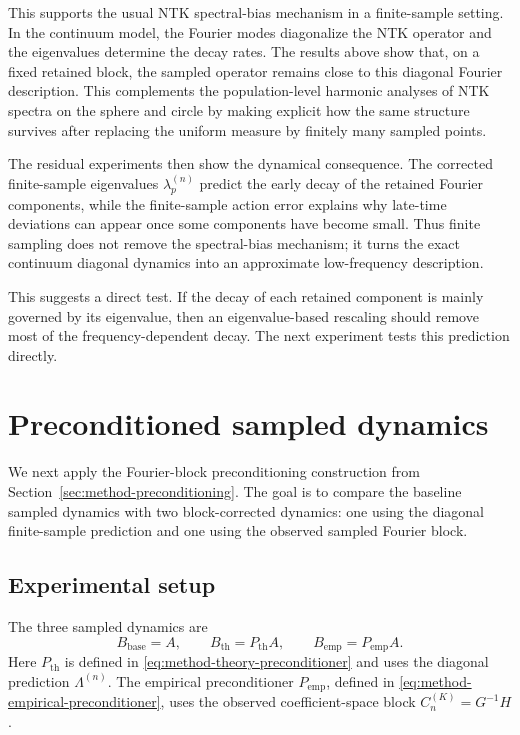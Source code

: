 This supports the usual NTK spectral-bias mechanism in a finite-sample setting.
In the continuum model, the Fourier modes diagonalize the NTK operator and the
eigenvalues determine the decay rates. The results above show that, on a fixed
retained block, the sampled operator remains close to this diagonal Fourier
description. This complements the population-level harmonic analyses of NTK
spectra on the sphere and circle
\citep{basri2019convergence,bietti2019inductivebiasneuraltangent,
	cao2020understandingspectralbiasdeep,basri2020frequencybiasneuralnetworks}
by making explicit how the same structure survives after replacing the uniform
measure by finitely many sampled points.

The residual experiments then show the dynamical consequence. The corrected
finite-sample eigenvalues \(\lambda_p^{(n)}\) predict the early decay of the
retained Fourier components, while the finite-sample action error explains why
late-time deviations can appear once some components have become small. Thus
finite sampling does not remove the spectral-bias mechanism; it turns the exact
continuum diagonal dynamics into an approximate low-frequency description.

This suggests a direct test. If the decay of each retained component is mainly
governed by its eigenvalue, then an eigenvalue-based rescaling should
remove most of the frequency-dependent decay. The next experiment tests this prediction directly.

\section{Preconditioned sampled dynamics}
\label{sec:results-preconditioned-sampled-dynamics}

We next apply the Fourier-block preconditioning construction from
Section~\ref{sec:method-preconditioning}. The goal is to compare the baseline
sampled dynamics with two block-corrected dynamics: one using the diagonal
finite-sample prediction and one using the observed sampled Fourier block.

\subsection{Experimental setup}
\label{subsec:results-preconditioned-setup}

The three sampled dynamics are
\[
	B_{\mathrm{base}}=A,
	\qquad
	B_{\mathrm{th}}=P_{\mathrm{th}}A,
	\qquad
	B_{\mathrm{emp}}=P_{\mathrm{emp}}A.
\]
Here \(P_{\mathrm{th}}\) is defined in
\eqref{eq:method-theory-preconditioner} and uses the diagonal prediction
\(\Lambda^{(n)}\). The empirical preconditioner \(P_{\mathrm{emp}}\), defined in
\eqref{eq:method-empirical-preconditioner}, uses the observed coefficient-space
block \(C_n^{(K)}=G^{-1}H\).

